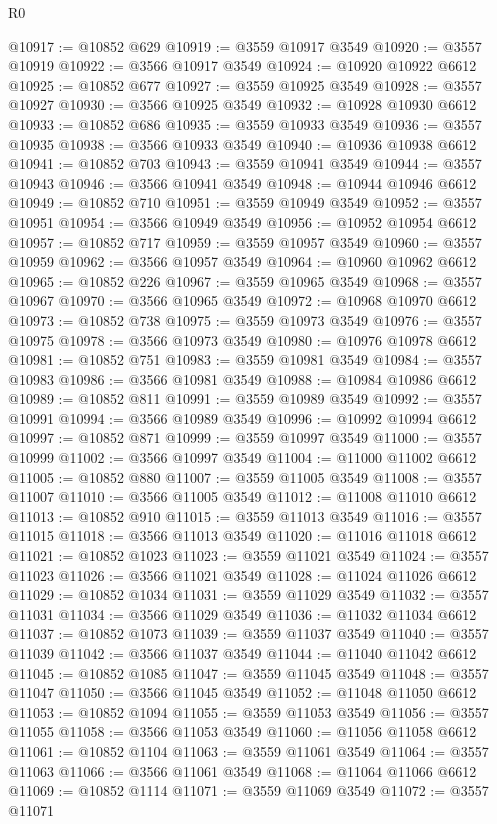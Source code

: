 \begin{lexlean}{R0}
\begin{coremodule}
@10917 := @10852 @629
@10919 := @3559 @10917 @3549
@10920 := @3557 @10919
@10922 := @3566 @10917 @3549
@10924 := @10920 @10922 @6612
@10925 := @10852 @677
@10927 := @3559 @10925 @3549
@10928 := @3557 @10927
@10930 := @3566 @10925 @3549
@10932 := @10928 @10930 @6612
@10933 := @10852 @686
@10935 := @3559 @10933 @3549
@10936 := @3557 @10935
@10938 := @3566 @10933 @3549
@10940 := @10936 @10938 @6612
@10941 := @10852 @703
@10943 := @3559 @10941 @3549
@10944 := @3557 @10943
@10946 := @3566 @10941 @3549
@10948 := @10944 @10946 @6612
@10949 := @10852 @710
@10951 := @3559 @10949 @3549
@10952 := @3557 @10951
@10954 := @3566 @10949 @3549
@10956 := @10952 @10954 @6612
@10957 := @10852 @717
@10959 := @3559 @10957 @3549
@10960 := @3557 @10959
@10962 := @3566 @10957 @3549
@10964 := @10960 @10962 @6612
@10965 := @10852 @226
@10967 := @3559 @10965 @3549
@10968 := @3557 @10967
@10970 := @3566 @10965 @3549
@10972 := @10968 @10970 @6612
@10973 := @10852 @738
@10975 := @3559 @10973 @3549
@10976 := @3557 @10975
@10978 := @3566 @10973 @3549
@10980 := @10976 @10978 @6612
@10981 := @10852 @751
@10983 := @3559 @10981 @3549
@10984 := @3557 @10983
@10986 := @3566 @10981 @3549
@10988 := @10984 @10986 @6612
@10989 := @10852 @811
@10991 := @3559 @10989 @3549
@10992 := @3557 @10991
@10994 := @3566 @10989 @3549
@10996 := @10992 @10994 @6612
@10997 := @10852 @871
@10999 := @3559 @10997 @3549
@11000 := @3557 @10999
@11002 := @3566 @10997 @3549
@11004 := @11000 @11002 @6612
@11005 := @10852 @880
@11007 := @3559 @11005 @3549
@11008 := @3557 @11007
@11010 := @3566 @11005 @3549
@11012 := @11008 @11010 @6612
@11013 := @10852 @910
@11015 := @3559 @11013 @3549
@11016 := @3557 @11015
@11018 := @3566 @11013 @3549
@11020 := @11016 @11018 @6612
@11021 := @10852 @1023
@11023 := @3559 @11021 @3549
@11024 := @3557 @11023
@11026 := @3566 @11021 @3549
@11028 := @11024 @11026 @6612
@11029 := @10852 @1034
@11031 := @3559 @11029 @3549
@11032 := @3557 @11031
@11034 := @3566 @11029 @3549
@11036 := @11032 @11034 @6612
@11037 := @10852 @1073
@11039 := @3559 @11037 @3549
@11040 := @3557 @11039
@11042 := @3566 @11037 @3549
@11044 := @11040 @11042 @6612
@11045 := @10852 @1085
@11047 := @3559 @11045 @3549
@11048 := @3557 @11047
@11050 := @3566 @11045 @3549
@11052 := @11048 @11050 @6612
@11053 := @10852 @1094
@11055 := @3559 @11053 @3549
@11056 := @3557 @11055
@11058 := @3566 @11053 @3549
@11060 := @11056 @11058 @6612
@11061 := @10852 @1104
@11063 := @3559 @11061 @3549
@11064 := @3557 @11063
@11066 := @3566 @11061 @3549
@11068 := @11064 @11066 @6612
@11069 := @10852 @1114
@11071 := @3559 @11069 @3549
@11072 := @3557 @11071

\end{coremodule}
\end{lexlean}
